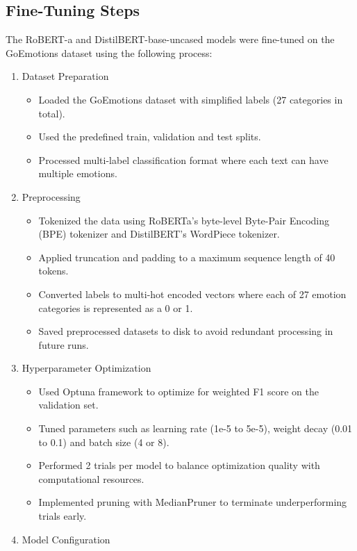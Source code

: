 \documentclass[titlepage]{article}
\begin{document}
\subsection{Fine-Tuning Steps}
The RoBERT-a and DistilBERT-base-uncased models were fine-tuned on the GoEmotions dataset using the following process:
\begin{enumerate}
    \item Dataset Preparation
        \begin{itemize}
            \item Loaded the GoEmotions dataset with simplified labels (27 categories in total).
            \item Used the predefined train, validation and test splits.
            \item Processed multi-label classification format where each text can have multiple emotions.
        \end{itemize}
    \item Preprocessing 
        \begin{itemize}
            \item Tokenized the data using RoBERTa's byte-level Byte-Pair Encoding (BPE) tokenizer and DistilBERT's WordPiece tokenizer.
            \item Applied truncation and padding to a maximum sequence length of 40 tokens.
            \item Converted labels to multi-hot encoded vectors where each of 27 emotion categories is represented as a 0 or 1.
            \item Saved preprocessed datasets to disk to avoid redundant processing in future runs.
        \end{itemize}
    \item Hyperparameter Optimization
        \begin{itemize}
            \item Used Optuna framework to optimize for weighted F1 score on the validation set.
            \item Tuned parameters such as learning rate (1e-5 to 5e-5), weight decay (0.01 to 0.1) and batch size (4 or 8).
            \item Performed 2 trials per model to balance optimization quality with computational resources.
            \item Implemented pruning with MedianPruner to terminate underperforming trials early.
        \end{itemize}
    \item Model Configuration 

\end{enumerate}
\end{document}
